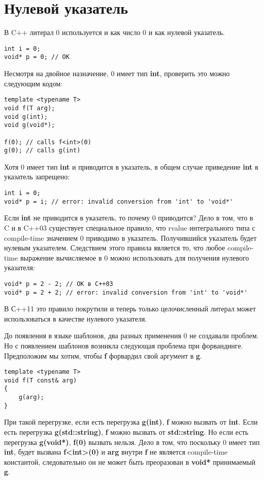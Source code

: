 \section{Нулевой указатель}
В C++ литерал 0 используется и как число 0 и как нулевой указатель. 
\begin{verbatim}
int i = 0;
void* p = 0; // OK
\end{verbatim}
Несмотря на двойное назначение, 0 имеет тип {\bf int}, проверить это можно следующим кодом:
\begin{verbatim}
template <typename T>
void f(T arg);
void g(int);
void g(void*);

f(0); // calls f<int>(0)
g(0); // calls g(int)
\end{verbatim}
Хотя 0 имеет тип {\bf int} и приводится в указатель, в общем случае приведение {\bf int} в указатель запрещено:
\begin{verbatim}
int i = 0;
void* p = i; // error: invalid conversion from 'int' to 'void*'
\end{verbatim}
Если {\bf int} не приводится в указатель, то почему 0 приводится? Дело в том, что в C и в C++03 существует специальное правило, что rvalue интегрального типа с compile-time значением 0 приводимо в указатель. Получившийся указатель будет нулевым указателем. Следствием этого правила является то, что любое compile-time выражение вычисляемое в 0 можно использовать для получения нулевого указателя:
\begin{verbatim}
void* p = 2 - 2; // OK в C++03
void* p = 2 + 2; // error: invalid conversion from 'int' to 'void*'
\end{verbatim}
В С++11 это правило покрутили и теперь только целочисленный литерал может использоваться в качестве нулевого указателя.

До появления в языке шаблонов, два разных применения 0 не создавали проблем. Но с появлением шаблонов возникла следующая проблема при форвандинге. Предположим мы хотим, чтобы {\bf f} форвардил свой аргумент в {\bf g}.
\begin{verbatim}
template <typename T>
void f(T const& arg)
{
    g(arg);
}
\end{verbatim}
При такой перегрузке, если есть перегрузка {\bf g(int)}, {\bf f} можно вызвать от {\bf int}. Если есть перегрузка {\bf g(std::string)}, {\bf f} можно вызвать от {\bf std::string}. Но если есть перегрузка {\bf g(void*)}, {\bf f(0)} вызвать нельзя. Дело в том, что поскольку 0 имеет тип {\bf int}, будет вызвана {\bf f<int>(0)} и {\bf arg} внутри {\bf f} не является compile-time константой, следовательно он не может быть преоразован в {\bf void*} принимаемый {\bf g}.

